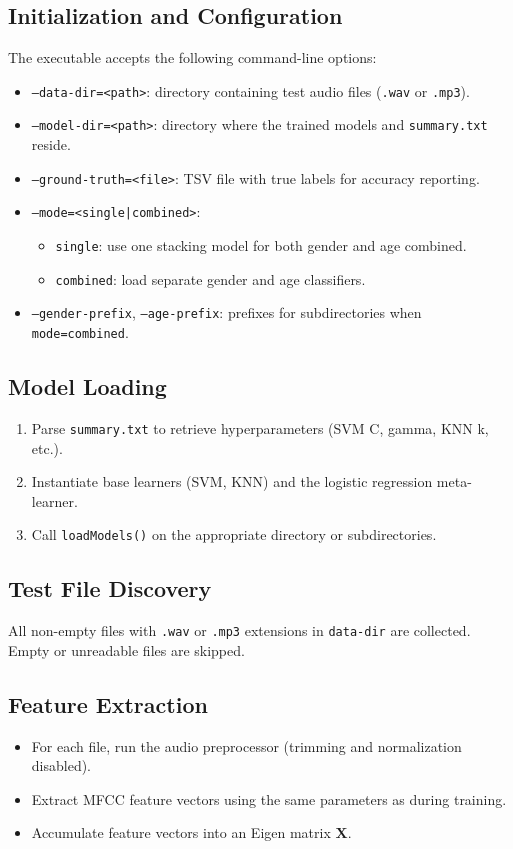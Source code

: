 \documentclass[a4paper,12pt]{article}
\begin{document}
\subsection{Initialization and Configuration}
The executable accepts the following command-line options:
\begin{itemize}
  \item \texttt{--data-dir=<path>}: directory containing test audio files (\texttt{.wav} or \texttt{.mp3}).
  \item \texttt{--model-dir=<path>}: directory where the trained models and \texttt{summary.txt} reside.
  \item \texttt{--ground-truth=<file>}: TSV file with true labels for accuracy reporting.
  \item \texttt{--mode=<single|combined>}:  
    \begin{itemize}
      \item \texttt{single}: use one stacking model for both gender and age combined.  
      \item \texttt{combined}: load separate gender and age classifiers.
    \end{itemize}
  \item \texttt{--gender-prefix}, \texttt{--age-prefix}: prefixes for subdirectories when \texttt{mode=combined}.
\end{itemize}

\subsection{Model Loading}
\begin{enumerate}
  \item Parse \texttt{summary.txt} to retrieve hyperparameters (SVM C, gamma, KNN k, etc.).
  \item Instantiate base learners (SVM, KNN) and the logistic regression meta-learner.
  \item Call \texttt{loadModels()} on the appropriate directory or subdirectories.
\end{enumerate}

\subsection{Test File Discovery}
All non-empty files with \texttt{.wav} or \texttt{.mp3} extensions in \texttt{data-dir} are collected. Empty or unreadable files are skipped.

\subsection{Feature Extraction}
\begin{itemize}
  \item For each file, run the audio preprocessor (trimming and normalization disabled).
  \item Extract MFCC feature vectors using the same parameters as during training.
  \item Accumulate feature vectors into an Eigen matrix \(\mathbf{X}\).
\end{itemize}
\end{document}
